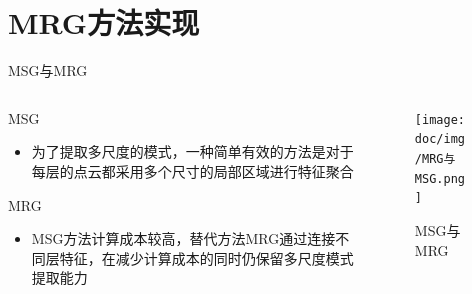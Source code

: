 \section{MRG方法实现}

\begin{frame}{MSG与MRG}
    \begin{columns}
        \begin{column}{0.50\textwidth}
            \begin{block}{MSG}
                \begin{itemize}
                    \item 为了提取多尺度的模式，一种简单有效的方法是对于每层的点云都采用多个尺寸的局部区域进行特征聚合
                \end{itemize}
            \end{block}
            \begin{block}{MRG}
                \begin{itemize}
                    \item MSG方法计算成本较高，替代方法MRG通过连接不同层特征，在减少计算成本的同时仍保留多尺度模式提取能力
                \end{itemize}
            \end{block}
        \end{column}
        \begin{column}{0.50\textwidth}
            \begin{figure}
                \centering
                \texttt{[image: doc/img/MRG与MSG.png]}
                \caption{MSG与MRG}
                \label{fig:MSG-MRG}
            \end{figure}
        \end{column}
    \end{columns}
\end{frame}

